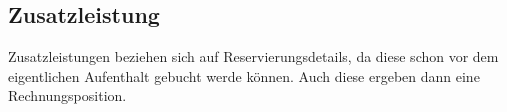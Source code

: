 \documentclass[../../Pflichtenheft.tex]{subfiles}
\begin{document}
    \subsection{Zusatzleistung}
    Zusatzleistungen beziehen sich auf Reservierungsdetails, da diese schon vor dem eigentlichen
    Aufenthalt gebucht werde können. Auch diese ergeben dann eine Rechnungsposition.
\end{document}
